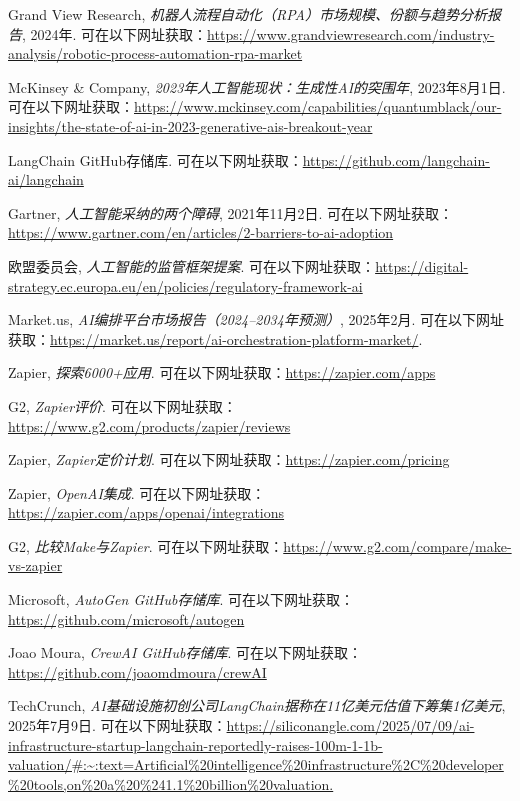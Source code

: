 \documentclass[11pt, a4paper, oneside]{article}
\begin{document}
\begin{thebibliography}{99}
    Grand View Research, \textit{机器人流程自动化（RPA）市场规模、份额与趋势分析报告}, 2024年. 可在以下网址获取：\url{https://www.grandviewresearch.com/industry-analysis/robotic-process-automation-rpa-market}

    McKinsey \& Company, \textit{2023年人工智能现状：生成性AI的突围年}, 2023年8月1日. 可在以下网址获取：\url{https://www.mckinsey.com/capabilities/quantumblack/our-insights/the-state-of-ai-in-2023-generative-ais-breakout-year}


    LangChain GitHub存储库. 可在以下网址获取：\url{https://github.com/langchain-ai/langchain}

    Gartner, \textit{人工智能采纳的两个障碍}, 2021年11月2日. 可在以下网址获取：\url{https://www.gartner.com/en/articles/2-barriers-to-ai-adoption}

    欧盟委员会, \textit{人工智能的监管框架提案}. 可在以下网址获取：\url{https://digital-strategy.ec.europa.eu/en/policies/regulatory-framework-ai}
    
    Market.us, \textit{AI编排平台市场报告（2024--2034年预测）}, 2025年2月. 可在以下网址获取：\url{https://market.us/report/ai-orchestration-platform-market/}.

    Zapier, \textit{探索6000+应用}. 可在以下网址获取：\url{https://zapier.com/apps}

    G2, \textit{Zapier评价}. 可在以下网址获取：\url{https://www.g2.com/products/zapier/reviews}

    Zapier, \textit{Zapier定价计划}. 可在以下网址获取：\url{https://zapier.com/pricing}


    Zapier, \textit{OpenAI集成}. 可在以下网址获取：\url{https://zapier.com/apps/openai/integrations}

    G2, \textit{比较Make与Zapier}. 可在以下网址获取：\url{https://www.g2.com/compare/make-vs-zapier}


    Microsoft, \textit{AutoGen GitHub存储库}. 可在以下网址获取：\url{https://github.com/microsoft/autogen}

    Joao Moura, \textit{CrewAI GitHub存储库}. 可在以下网址获取：\url{https://github.com/joaomdmoura/crewAI}

    TechCrunch, \textit{AI基础设施初创公司LangChain据称在11亿美元估值下筹集1亿美元}, 2025年7月9日. 可在以下网址获取：\url{https://siliconangle.com/2025/07/09/ai-infrastructure-startup-langchain-reportedly-raises-100m-1-1b-valuation/#:~:text=Artificial%20intelligence%20infrastructure%2C%20developer%20tools,on%20a%20%241.1%20billion%20valuation.}


\end{thebibliography}
\end{document}
